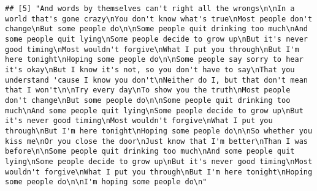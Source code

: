 \documentclass[]{article}
\begin{document}
\begin{verbatim}
## [5] "And words by themselves can't right all the wrongs\n\nIn a world that's gone crazy\nYou don't know what's true\nMost people don't change\nBut some people do\n\nSome people quit drinking too much\nAnd some people quit lying\nSome people decide to grow up\nBut it's never good timing\nMost wouldn't forgive\nWhat I put you through\nBut I'm here tonight\nHoping some people do\n\nSome people say sorry to hear it's okay\nBut I know it's not, so you don't have to say\nThat you understand 'cause I know you don't\nNeither do I, but that don't mean that I won't\n\nTry every day\nTo show you the truth\nMost people don't change\nBut some people do\n\nSome people quit drinking too much\nAnd some people quit lying\nSome people decide to grow up\nBut it's never good timing\nMost wouldn't forgive\nWhat I put you through\nBut I'm here tonight\nHoping some people do\n\nSo whether you kiss me\nOr you close the door\nJust know that I'm better\nThan I was before\n\nSome people quit drinking too much\nAnd some people quit lying\nSome people decide to grow up\nBut it's never good timing\nMost wouldn't forgive\nWhat I put you through\nBut I'm here tonight\nHoping some people do\n\nI'm hoping some people do\n"                                                                                                                                                                                                                                                                                                                                                                                                                                                                                                                                                                   

\end{verbatim}
\end{document}
